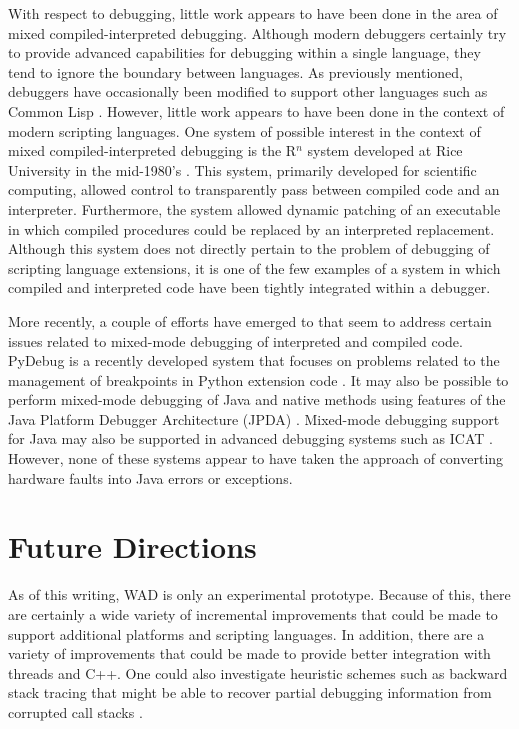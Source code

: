 With respect to debugging, little work appears to have been done in the area of
mixed compiled-interpreted debugging.   Although modern debuggers
certainly try to provide advanced capabilities for debugging within a
single language, they tend to ignore the boundary between languages.
As previously mentioned, debuggers have occasionally been modified to
support other languages such as Common Lisp \cite{wcl}.  However, little work appears
to have been done in the context of modern scripting languages.  One system of possible interest
in the context of mixed compiled-interpreted debugging is the R$^{n}$
system developed at Rice University in the mid-1980's \cite{carle}.  This
system, primarily developed for scientific computing, allowed control
to transparently pass between compiled code and an interpreter.
Furthermore, the system allowed dynamic patching of an executable in
which compiled procedures could be replaced by an interpreted
replacement.  Although this system does not directly pertain to the problem of 
debugging of scripting language extensions, it is one of the few
examples of a system in which compiled and interpreted code have been
tightly integrated within a debugger.

More recently, a couple of efforts have emerged to that seem to
address certain issues related to mixed-mode debugging of interpreted
and compiled code. PyDebug is a recently developed system that focuses
on problems related to the management of breakpoints in Python
extension code \cite{pydebug}.  It may also be possible to perform
mixed-mode debugging of Java and native methods using features of the
Java Platform Debugger Architecture (JPDA) \cite{jpda}.  Mixed-mode
debugging support for Java may also be supported in advanced debugging systems
such as ICAT \cite{icat}.
However, none of these systems appear to have taken the approach of
converting hardware faults into Java errors or exceptions.

\section{Future Directions}

As of this writing, WAD is only an experimental prototype.  Because of
this, there are certainly a wide variety of incremental improvements
that could be made to support additional platforms and scripting
languages. In addition, there are a variety of improvements that could be made
to provide better integration with threads and C++.  One could also
investigate heuristic schemes such as backward stack tracing that might be able
to recover partial debugging information from corrupted call stacks \cite{debug}.

